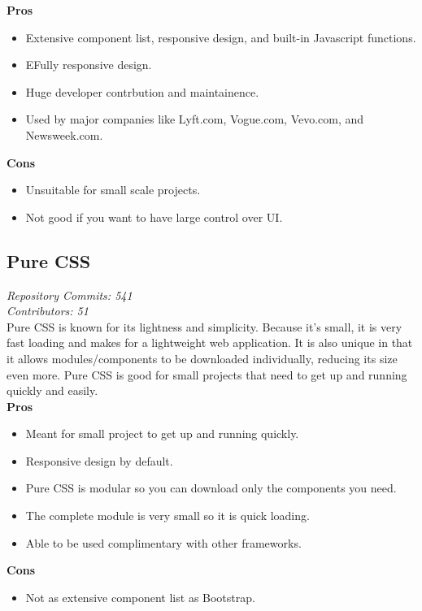 \documentclass[onecolumn, draftclsnofoot,10pt, compsoc]{IEEEtran}
\begin{document}
\textbf{Pros}
\begin{itemize}
    \item Extensive component list, responsive design, and built-in Javascript functions.\cite{puranjay_2015}
    \item EFully responsive design.
    \item Huge developer contrbution and maintainence.
    \item Used by major companies like Lyft.com, Vogue.com, Vevo.com, and Newsweek.com. \cite{puranjay_2015}
\end{itemize}
\textbf{Cons}
\begin{itemize}
    \item Unsuitable for small scale projects. \cite{puranjay_2015}
    \item Not good if you want to have large control over UI.
\end{itemize}
\subsection{Pure CSS}
\textit{Repository Commits: 541}\\ 
\textit{Contributors: 51}\\
Pure CSS is known for its lightness and simplicity. Because it's small, it is very fast loading and makes for a lightweight web application. It is also unique in that it allows modules/components to be downloaded individually, reducing its size even more. Pure CSS is good for small projects that need to get up and running quickly and easily.\\
\textbf{Pros}
\begin{itemize}
    \item Meant for small project to get up and running quickly.
    \item Responsive design by default.
    \item Pure CSS is modular so you can download only the components you need.
    \item The complete module is very small so it is quick loading.
    \item Able to be used complimentary with other frameworks.
\end{itemize}
\textbf{Cons} 
\begin{itemize}
    \item Not as extensive component list as Bootstrap.
\end{itemize}
\end{document}
